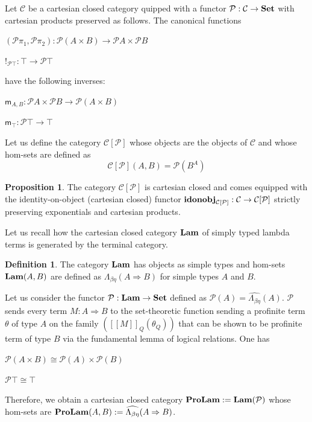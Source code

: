 \documentclass[8pt]{article}
\theoremstyle{definition}
\newtheorem{definition}{Definition}[section]
\theoremstyle{definition}
\theoremstyle{definition}
\theoremstyle{definition}
\theoremstyle{definition}
\theoremstyle{definition}
\theoremstyle{definition}
\newtheorem{prop}{Proposition}[section]
\theoremstyle{definition}
\theoremstyle{definition}
\theoremstyle{definition}
\theoremstyle{definition}
\theoremstyle{definition}
\theoremstyle{definition}
\theoremstyle{definition}
\theoremstyle{question}
\begin{document}
Let $\mathcal{C}$ be a cartesian closed category quipped with a functor $\mathcal{P} : \mathcal{C} \to {\bf Set}$
with cartesian products preserved as follows. The canonical functions
\begin{center}
  $(\mathcal{P} \pi_1, \mathcal{P} \pi_2) : \mathcal{P}(A \times B) \to \mathcal{P}A \times \mathcal{P}B$

  $!_{\mathcal{P}\top} : \top \to \mathcal{P} \top$
\end{center}
have the following inverses:
\begin{center}
  $\mathsf{m}_{A, B} : \mathcal{P}A \times \mathcal{P}B \to \mathcal{P}(A \times B)$

  $\mathsf{m}_{\top} : \mathcal{P} \top \to \top$
\end{center}
Let us define the category $\mathcal{C}[\mathcal{P}]$ whose objects are the objects of $\mathcal{C}$
and whose hom-sets are defined as
\[
\mathcal{C}[\mathcal{P}](A,B) = \mathcal{P}(B^A)
\]
\begin{prop}
  The category $\mathcal{C}[\mathcal{P}]$ is cartesian closed and comes equipped with the identity-on-object (cartesian
  closed) functor ${\bf idonobj}_{\mathcal{C}[\mathcal{P}]} : \mathcal{C} \to \mathcal{C}[\mathcal{P}]$
  strictly preserving exponentials and cartesian products.
\end{prop}

Let us recall how the cartesian closed category ${\bf Lam}$ of simply typed lambda terms is generated by the terminal category.

\begin{definition}
  The category ${\bf Lam}$ has objects as simple types and hom-sets ${\bf Lam}(A,B)$ are 
  defined as $\Lambda_{\beta \eta}(A \Rightarrow B)$ for simple types $A$ and $B$.
\end{definition}

Let us consider the functor $\mathcal{P} : {\bf Lam} \to {\bf Set}$ defined as 
$\mathcal{P}(A) = \widehat{\Lambda_{\beta \eta}}(A)$. $\mathcal{P}$ sends every term $M : A \Rightarrow B$
to the set-theoretic function sending a profinite term $\theta$ of type $A$ on the family $([\![M]\!]_Q (\theta_Q))$
that can be shown to be profinite term of type $B$ via the fundamental lemma of logical relations. One has
\begin{center}
  $\mathcal{P}(A \times B) \cong \mathcal{P}(A) \times \mathcal{P}(B)$

  $\mathcal{P} \top \cong \top$
\end{center}
Therefore, we obtain a cartesian closed category ${\bf ProLam} := {\bf Lam}(\mathcal{P})$
whose hom-sets are ${\bf ProLam}(A,B) := \widehat{\Lambda_{\beta \eta}}(A \Rightarrow B)$.
\end{document}
